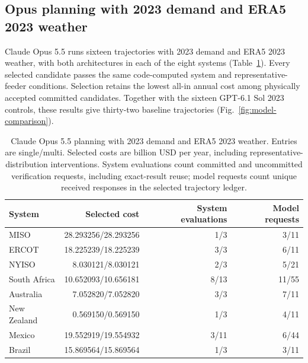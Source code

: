 \documentclass[pdflatex,sn-nature]{sn-jnl}
\begin{document}
\begin{appendices}
\subsection{Opus planning with 2023 demand and ERA5 2023 weather}\label{sec:opus-base}
Claude Opus 5.5 runs sixteen trajectories with 2023 demand and ERA5 2023 weather, with both architectures in each of the eight systems (Table~\ref{tab:opus-2023}). Every selected candidate passes the same code-computed system and representative-feeder conditions. Selection retains the lowest all-in annual cost among physically accepted committed candidates. Together with the sixteen GPT-6.1 Sol 2023 controls, these results give thirty-two baseline trajectories (Fig.~\ref{fig:model-comparison}).

\begin{table}[tbp]
\caption{Claude Opus 5.5 planning with 2023 demand and ERA5 2023 weather. Entries are single/multi. Selected costs are billion USD per year, including representative-distribution interventions. System evaluations count committed and uncommitted verification requests, including exact-result reuse; model requests count unique received responses in the selected trajectory ledger. }
\label{tab:opus-2023}
\centering\small
\begin{tabular}{@{}lrrr@{}}
\toprule
System & Selected cost & System evaluations & Model requests\\
\midrule
MISO & 28.293256/28.293256 & 1/3 & 3/11\\
ERCOT & 18.225239/18.225239 & 3/3 & 6/11\\
NYISO & 8.030121/8.030121 & 2/3 & 5/21\\
South Africa & 10.652093/10.656181 & 8/13 & 11/55\\
Australia & 7.052820/7.052820 & 3/3 & 7/11\\
New Zealand & 0.569150/0.569150 & 1/3 & 4/11\\
Mexico & 19.552919/19.554932 & 3/11 & 6/44\\
Brazil & 15.869564/15.869564 & 1/3 & 3/11\\
\bottomrule
\end{tabular}
\end{table}


\end{appendices}
\end{document}
